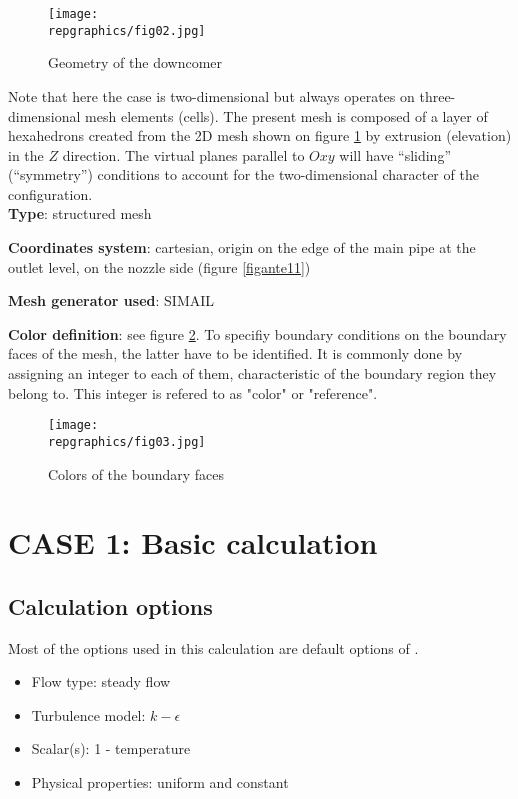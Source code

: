 \begin{figure}[h!]
\begin{center}
\texttt{[image: \\repgraphics/fig02.jpg]}
\caption{Geometry of the downcomer}
\label{figante12}
\end{center}
\end{figure}

Note that here the case is two-dimensional but \CS always operates on three-dimensional
mesh elements (cells). The present mesh is composed of a layer of hexahedrons
created from the 2D mesh shown on figure \ref{figante12} by
extrusion (elevation) in the $Z$ direction. The virtual planes
parallel to $Oxy$ will have ``sliding'' (``symmetry'') conditions to account for
the two-dimensional character of the configuration.\\

{\bfseries Type}: structured mesh

{\bfseries Coordinates system}: cartesian, origin on the edge of the main
pipe at the outlet level, on the nozzle side (figure \ref{figante11})

{\bfseries Mesh generator used}: SIMAIL

{\bfseries Color definition}: see figure \ref{figante13}. To specifiy boundary
conditions on the boundary faces of the mesh, the latter have to be
identified. It is commonly done by assigning an integer to each of them,
characteristic of the boundary region they belong to. This integer is refered to
as "color" or "reference".

\begin{figure}[ht]
\begin{center}
\texttt{[image: \\repgraphics/fig03.jpg]}
\caption{Colors of the boundary faces}
\label{figante13}
\end{center}
\end{figure}


\section{CASE 1: Basic calculation}

        \subsection{Calculation options}

Most of the options used in this calculation are default options of \CS.
\begin{itemize}
\renewcommand{\labelitemi}{$\rightarrow$}
        \item Flow type: steady flow
        \item Turbulence model: $k-\epsilon$
        \item Scalar(s): 1 - temperature
        \item Physical properties: uniform and constant
\end{itemize}


